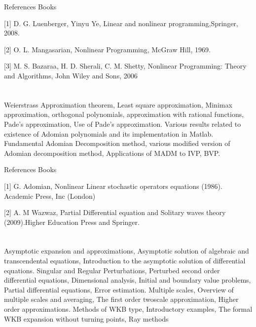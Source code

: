  

References Books  

[1]  D. G. Luenberger, Yinyu Ye, Linear and nonlinear programming,Springer, 2008. 

[2]  O. L. Mangasarian, Nonlinear Programming, McGraw Hill, 1969. 

[3] M. S. Bazaraa, H. D. Sherali, C. M. Shetty, Nonlinear Programming: Theory and Algorithms, John Wiley and Sons, 2006 

 
\section{\dsccourseinfo}

Weierstrass Approximation theorem, Least square approximation, Minimax approximation, orthogonal polynomials, approximation with rational functions, Pade’s approximation, Use of Pade’s approximation. Various results related to existence of Adomian polynomials and its implementation in Matlab. Fundamental Adomian Decomposition method, various modified version of Adomian decomposition method, Applications of MADM to IVP, BVP. 

 

References Books  

[1] G. Adomian, Nonlinear Linear stochastic operators equations (1986). Academic Press, Inc (London)  

[2] A. M Wazwaz, Partial Differential equation and Solitary waves theory (2009).Higher Education Press and Springer. 

 
\section{\dsccourseinfo}

 

 Asymptotic expansion and approximations, Asymptotic solution of algebraic and transcendental equations, Introduction to the asymptotic solution of differential equations. Singular and Regular Perturbations, Perturbed second order differential equations, Dimensional analysis, Initial and boundary value problems, Partial differential equations, Error estimation. Multiple scales, Overview of multiple scales and averaging, The first order twoscale approximation, Higher order approximations. Methods of WKB type, Introductory examples, The formal WKB expansion without turning points, Ray methods 

